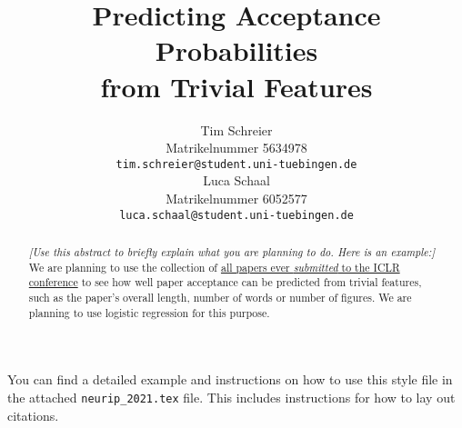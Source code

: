\documentclass{article}
\title{Predicting Acceptance Probabilities\\ from Trivial Features}
\author{%
  Tim Schreier\\
  Matrikelnummer 5634978\\
  \texttt{tim.schreier@student.uni-tuebingen.de} \\
  \And
  Luca Schaal\\
  Matrikelnummer 6052577\\
  \texttt{luca.schaal@student.uni-tuebingen.de} \\
}
\begin{document}
\maketitle

\begin{abstract}
  \emph{[Use this abstract to briefly explain what you are planning to do. Here is an example:]} We are planning to use the collection of \href{https://openreview-py.readthedocs.io/en/latest/getting_data.html}{all papers ever \emph{submitted} to the ICLR conference} to see how well paper acceptance can be predicted from trivial features, such as the paper's overall length, number of words or number of figures. We are planning to use logistic regression for this purpose.
\end{abstract}

You can find a detailed example and instructions on how to use this style file in the attached \texttt{neurip\_2021.tex} file. This includes instructions for how to lay out citations.
\end{document}

